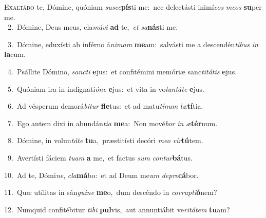 \lettrine{\initial\textcolor{\initialcolor}{E}}{xaltábo} te, Dómine, quóniam \textit{su}\-\textit{sce}\textbf{pís}ti me:~\star nec delectásti inimí\textit{cos} \textit{me}\-\textit{os} \textbf{su}\-per me.\\
{\numbfont\textcolor{\numbcolor}{~2.}}~Dómine, Deus meus, cla\-\textit{má}\-\textit{vi} \textbf{ad} te,~\star \textit{et} \textit{sa}\-\textbf{nás}ti me.\par
{\numbfont\textcolor{\numbcolor}{~3.}}~Dómine, eduxísti ab inférno á\-\textit{ni}\-\textit{mam} \textbf{me}\-am:~\star salvásti me a descendén\-\textit{ti}\-\textit{bus} \textit{in} \textbf{la}\-cum.\par
{\numbfont\textcolor{\numbcolor}{~4.}}~Psállite Dómino, \textit{sanc}\-\textit{ti} \textbf{e}\-jus:~\star et confitémini memóriæ sanc\-\textit{ti}\-\textit{tá}\textit{tis} \textbf{e}\-jus.\par
{\numbfont\textcolor{\numbcolor}{~5.}}~Quóniam ira in indignati\-\textit{ó}\-\textit{ne} \textbf{e}\-jus:~\star et vita in vo\-\textit{lun}\-\textit{tá}\textit{te} \textbf{e}\-jus.\par
{\numbfont\textcolor{\numbcolor}{~6.}}~Ad vésperum demorá\-\textit{bi}\-\textit{tur} \textbf{fle}\-tus:~\star et ad matu\-\textit{tí}\-\textit{num} \textit{læ}\-\textbf{tí}tia.\par
{\numbfont\textcolor{\numbcolor}{~7.}}~Ego autem dixi in abundán\-\textit{ti}\-\textit{a} \textbf{me}\-a:~\star Non mové\textit{bor} \textit{in} \textit{æ}\-\textbf{tér}num.\par
{\numbfont\textcolor{\numbcolor}{~8.}}~Dómine, in volun\-\textit{tá}\-\textit{te} \textbf{tu}\-a,~\star præstitísti decóri \textit{me}\-\textit{o} \textit{vir}\-\textbf{tú}tem.\par
{\numbfont\textcolor{\numbcolor}{~9.}}~Avertísti fáciem \textit{tu}\-\textit{am} \textbf{a} me,~\star et factus \textit{sum} \textit{con}\-\textit{tur}\textbf{bá}tus.\par
{\numbfont\textcolor{\numbcolor}{10.}}~Ad te, Dómi\-\textit{ne}\-, \textit{cla}\-\textbf{má}bo:~\star et ad Deum me\textit{um} \textit{de}\-\textit{pre}\textbf{cá}bor.\par
{\numbfont\textcolor{\numbcolor}{11.}}~Quæ utílitas in sán\-\textit{gui}\-\textit{ne} \textbf{me}\-o,~\star dum descéndo in \textit{cor}\-\textit{rup}\textit{ti}\textbf{ó}nem?\par
{\numbfont\textcolor{\numbcolor}{12.}}~Numquid confitébitur \textit{ti}\-\textit{bi} \textbf{pul}\-vis,~\star aut annuntiábit ve\-\textit{ri}\-\textit{tá}\textit{tem} \textbf{tu}\-am?\par
